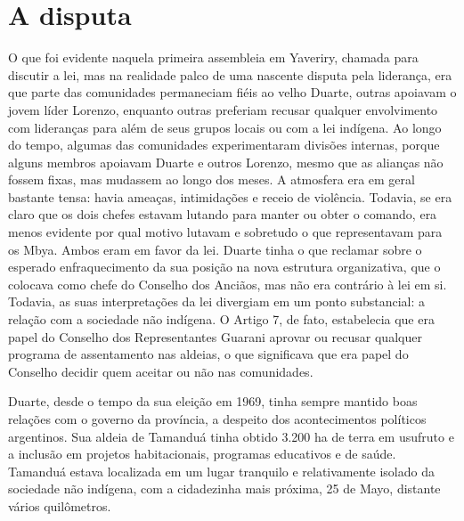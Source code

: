 \section{A disputa}

O que foi evidente naquela primeira assembleia em Yaveriry, chamada para
discutir a lei, mas na realidade palco de uma nascente disputa pela
liderança, era que parte das comunidades permaneciam fiéis ao velho
Duarte, outras apoiavam o jovem líder Lorenzo, enquanto outras
preferiam recusar qualquer envolvimento com lideranças para além de
seus grupos locais ou com a lei indígena. Ao longo do tempo, algumas
das comunidades experimentaram divisões internas, porque alguns membros
apoiavam Duarte e outros Lorenzo, mesmo que as alianças não fossem
fixas, mas mudassem ao longo dos meses. A atmosfera era em geral
bastante tensa: havia ameaças, intimidações e receio de violência.
Todavia, se era claro que os dois chefes estavam lutando para manter ou
obter o comando, era menos evidente por qual motivo lutavam e sobretudo
o que representavam para os Mbya. Ambos eram em favor da lei. Duarte
tinha o que reclamar sobre o esperado enfraquecimento da sua posição na
nova estrutura organizativa, que o colocava como chefe do Conselho dos
Anciãos, mas não era contrário à lei em si. Todavia, as suas
interpretações da lei divergiam em um ponto substancial: a relação com
a sociedade não indígena. O Artigo 7, de fato, estabelecia que era
papel do Conselho dos Representantes Guarani aprovar ou recusar
qualquer programa de assentamento nas aldeias, o que significava que
era papel do Conselho decidir quem aceitar ou não nas comunidades.

Duarte, desde o tempo da sua eleição em 1969, tinha sempre mantido boas
relações com o governo da província, a despeito dos acontecimentos
políticos argentinos. Sua aldeia de Tamanduá tinha obtido 3.200 ha de
terra em usufruto e a inclusão em projetos habitacionais, programas
educativos e de saúde. Tamanduá estava localizada em um lugar tranquilo
e relativamente isolado da sociedade não indígena, com a cidadezinha
mais próxima, 25 de Mayo, distante vários quilômetros. 

